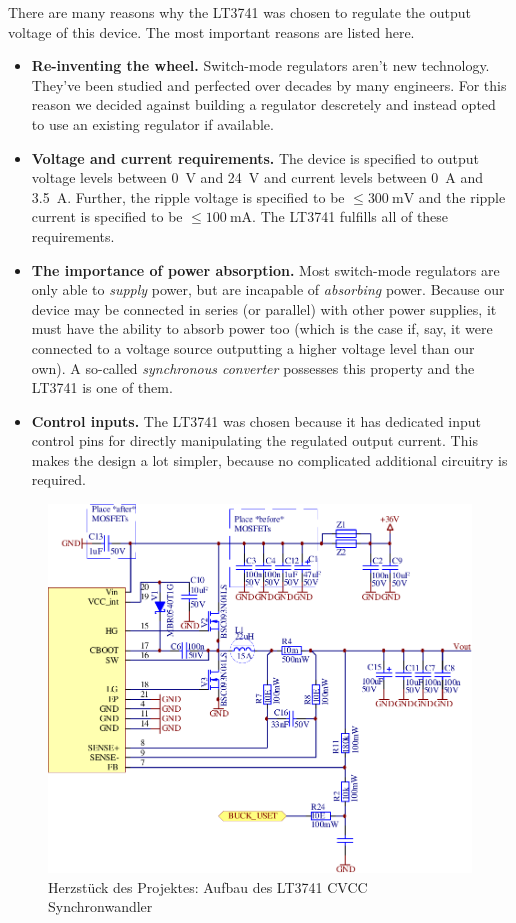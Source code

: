 There are  many reasons why the LT3741 was chosen to regulate the output voltage
of this device. The most important reasons are listed here.
\begin{itemize}
    \item \textbf{Re-inventing the wheel.}
        Switch-mode regulators aren't new technology. They've been studied and perfected
        over decades by many engineers. For  this  reason  we decided against building a
        regulator  descretely  and  instead  opted  to  use  an  existing  regulator  if
        available.
    \item \textbf{Voltage and current requirements.}
        The device is specified to  output  voltage  levels  between  \SI{0}{\volt}  and
        \SI{24}{\volt} and current levels between \SI{0}{\ampere} and \SI{3.5}{\ampere}.
        Further,  the  ripple voltage is specified to be $\le\SI{300}{\milli\volt}$  and
        the ripple current  is  specified to be $\le\SI{100}{\milli\ampere}$. The LT3741
        fulfills all of these requirements.
    \item \textbf{The importance of power absorption.}
        Most switch-mode  regulators  are  only  able  to  \emph{supply}  power, but are
        incapable  of  \emph{absorbing} power. Because our device may  be  connected  in
        series (or parallel) with other power  supplies,  it  must  have  the ability to
        absorb  power  too (which is the case if, say, it were connected  to  a  voltage
        source   outputting   a   higher  voltage  level  than  our  own).  A  so-called
        \emph{synchronous  converter} possesses this property and the LT3741 is  one  of
        them.
    \item \textbf{Control inputs.}
        The LT3741 was chosen  because  it has dedicated input control pins for directly
        manipulating the regulated output current.  This makes the design a lot simpler,
        because no complicated additional circuitry is required.
\end{itemize}

\begin{figure}[th!]
    \center
    \includegraphics[width=.75\textwidth]{images/circuit/buck.pdf}
    \caption{Herzst\"uck des Projektes: Aufbau des LT3741 CVCC Synchronwandler}
    \label{fig:circuit:buck}
\end{figure}

